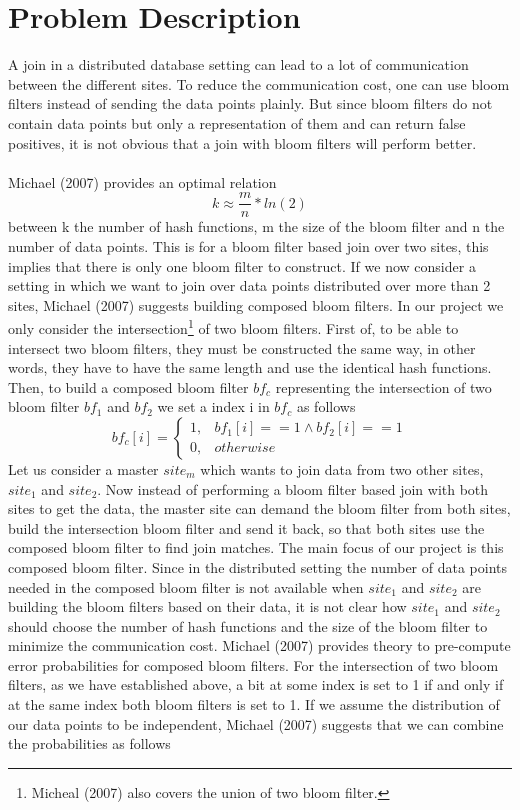 \documentclass[12]{scrartcl}
\begin{document}
\section{Problem Description}
A join in a distributed database setting can lead to a lot of communication between the different sites. To reduce the communication cost, one can use bloom filters instead of sending the data points plainly. But since bloom filters do not contain data points but only a representation of them and can return false positives, it is not obvious that a join with bloom filters will perform better.\\\\
Michael (2007) provides an optimal relation
\begin{equation}
	k \approx \frac{m}{n}*ln(2)
\end{equation}
between k the number of hash functions, m the size of the bloom filter and n the number of data points. This is for a bloom filter based join over two sites, this implies that there is only one bloom filter to construct. If we now consider a setting in which we want to join over data points distributed over more than 2 sites, Michael (2007) suggests building composed bloom filters. In our project we only consider the intersection\footnote{Micheal (2007) also covers the union of two bloom filter.} of two bloom filters. First of, to be able to intersect two bloom filters, they must be constructed the same way, in other words, they have to have the same length and use the identical hash functions.\\ Then, to build a composed bloom filter $bf_c$ representing the intersection of two bloom filter  $bf_1$ and $bf_2$ we set a index i in $bf_c$ as follows
\begin{equation}
	bf_c[i] = 
	\begin{cases}
	1, & bf_1[i] == 1 \wedge bf_2[i] == 1\\
	0, & otherwise
	\end{cases}
\end{equation}
Let us consider a master $site_m$ which wants to join data from two other sites, $site_1$ and $site_2$. Now instead of performing a bloom filter based join with both sites to get the data, the master site can demand the bloom filter from both sites, build the intersection bloom filter and send it back, so that both sites use the composed bloom filter to find join matches. The main focus of our project is this composed bloom filter. Since in the distributed setting the number of data points needed in the composed bloom filter is not available when $site_1$ and $site_2$ are building the bloom filters based on their data, it is not clear how $site_1$ and $site_2$ should choose the number of hash functions and the size of the bloom filter to minimize the communication cost. Michael (2007) provides theory to pre-compute error probabilities for composed bloom filters. For the intersection of two bloom filters, as we have established above, a bit at some index is set to 1 if and only if at the same index both bloom filters is set to 1. If we assume the distribution of our data points to be independent, Michael (2007) suggests that we can combine the probabilities as follows
\end{document}
